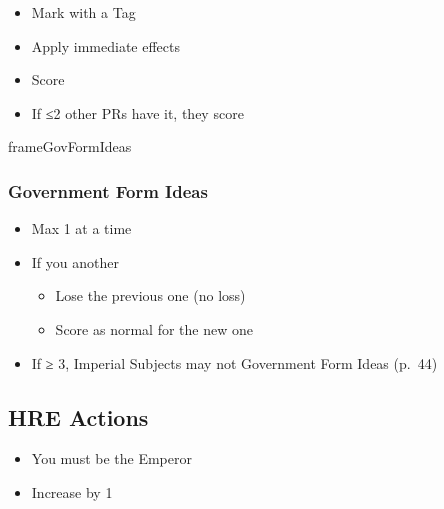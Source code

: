 \documentclass[10pt]{article}
\begin{document}
\begin{itemize}
	\item Mark with a Tag
	\item Apply immediate effects
	\item Score 
	\item If ≤2 other PRs have it, they score 
\end{itemize}
\begin{dynamiccontents*}{frameGovFormIdeas}
	\subsubsection*{Government Form Ideas }
	\begin{itemize}
		\item Max 1 at a time
		\item If you  another
		\begin{itemize}
			\item Lose the previous one (no \prestige loss)
			\item Score \prestige as normal for the new one
		\end{itemize}
		\item If \authority ≥ 3, Imperial Subjects may not  Government Form Ideas (p.~44)
	\end{itemize}
\end{dynamiccontents*}

\vspace{4\baselineskip}
\subsection*{HRE Actions}
\begin{itemize}
	\item You must be the Emperor
	\item Increase \authority by 1
\end{itemize}
\end{document}
